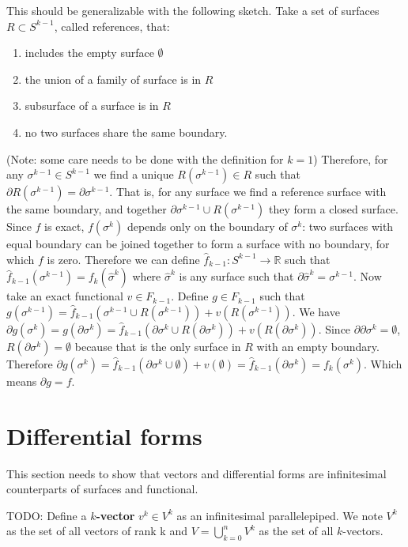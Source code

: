 \documentclass[11pt,letterpaper,fleqn]{memoir}
\begin{document}
\begin{remark}
	This should be generalizable with the following sketch. Take a set of surfaces $R \subset S^{k-1}$, called references, that:
	\begin{enumerate}
		\item includes the empty surface $\emptyset$
		\item the union of a family of surface is in $R$
		\item subsurface of a surface is in $R$
		\item no two surfaces share the same boundary.
	\end{enumerate}
	(Note: some care needs to be done with the definition for $k=1$) Therefore, for any $\sigma^{k-1} \in S^{k-1}$ we find a unique $R(\sigma^{k-1}) \in R$ such that $\partial R(\sigma^{k-1}) = \partial \sigma^{k-1}$. That is, for any surface we find a reference surface with the same boundary, and together $\partial \sigma^{k-1} \cup R(\sigma^{k-1})$ they form a closed surface. Since $f$ is exact, $f(\sigma^k)$ depends only on the boundary of $\sigma^k$: two surfaces with equal boundary can be joined together to form a surface with no boundary, for which $f$ is zero. Therefore we can define $\hat{f}_{k-1} : S^{k-1} \to \mathbb{R}$ such that $\hat{f}_{k-1}(\sigma^{k-1}) = f_k(\hat{\sigma}^{k})$ where $\hat{\sigma}^{k}$ is any surface such that $\partial \hat{\sigma}^{k} = \sigma^{k-1}$. Now take an exact functional $v \in F_{k-1}$. Define $g \in F_{k-1}$ such that $g(\sigma^{k-1}) = \hat{f}_{k-1}(\sigma^{k-1} \cup R(\sigma^{k-1})) + v(R(\sigma^{k-1}))$. We have $\partial g(\sigma^{k}) = g(\partial \sigma^{k}) = \hat{f}_{k-1}(\partial \sigma^{k} \cup R(\partial \sigma^{k})) + v(R(\partial \sigma^{k}))$. Since $\partial \partial \sigma^k = \emptyset$, $R(\partial \sigma^{k}) = \emptyset$ because that is the only surface in $R$ with an empty boundary. Therefore $\partial g(\sigma^k) = \hat{f}_{k-1}(\partial \sigma^k \cup \emptyset) + v(\emptyset) = \hat{f}_{k-1}(\partial \sigma^k) = f_k(\sigma^k)$. Which means $\partial g = f$.
\end{remark}


\iffalse

\section{Differential forms}

This section needs to show that vectors and differential forms are infinitesimal counterparts of surfaces and functional. 


\begin{defn}
	TODO: Define a \textbf{$k$-vector} $v^k \in V^k$ as an infinitesimal parallelepiped. We note $V^k$ as the set of all vectors of rank k and $V = \bigcup_{k=0}^n V^k$ as the set of all $k$-vectors. 
\end{defn}
\end{document}
